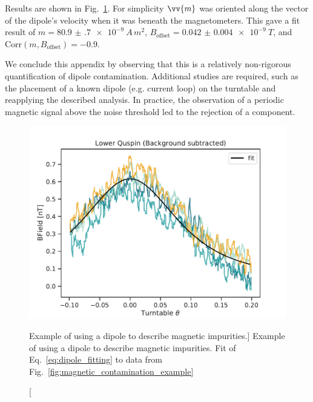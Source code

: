 Results are shown in Fig.~\ref{fig:lower_quspin_contamination_fit}. For simplicity $\vv{m}$ was oriented along the vector of the dipole's velocity when it was beneath the magnetometers. This gave a fit result of $m=\qty{80.9(7)e-9}{A\,m^2}$, $B_\text{offset}=\qty{0.042(4)e-9}{T}$, and $\text{Corr}(m, B_\text{offset})=-0.9$.

We conclude this appendix by observing that this is a relatively non-rigorous quantification of dipole contamination. Additional studies are required, such as the placement of a known dipole (e.g. current loop) on the turntable and reapplying the described analysis. In practice, the observation of a periodic magnetic signal above the noise threshold led to the rejection of a component. 

\begin{figure}
    \centering
    \includegraphics[width=0.7 \textwidth]{figures/quspin_fit.pdf}
    \caption
    [Example of using a dipole to describe magnetic impurities.]
    {Example of using a dipole to describe magnetic impurities. Fit of Eq.~\ref{eq:dipole_fitting} to data from Fig.~\ref{fig:magnetic_contamination_example}}
    \label{fig:lower_quspin_contamination_fit}
\end{figure}